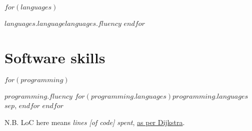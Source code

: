 \documentclass[fontsize=10pt]{tccv}
\begin{document}
\begin{factlist}
  $for(languages)$
\item{$languages.language$}{$languages.fluency$}
  $endfor$
\end{factlist}

\section{Software skills}

\begin{factlist}

  $for(programming)$
\item{$programming.fluency$}
  {$for(programming.languages)$$programming.languages$$sep$, $endfor$}
  $endfor$

\end{factlist}

\footnotesize{N.B. LoC here means \textit{lines [of code] spent}, \href{http://www.cs.utexas.edu/users/EWD/transcriptions/EWD10xx/EWD1036.html}{as per Dijkstra}.}
\end{document}
